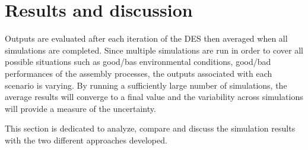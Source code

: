 \section{Results and discussion}
\label{results}
Outputs are evaluated after each iteration of the DES then averaged when all simulations are completed. Since multiple simulations are run in order to cover all possible situations such as good/bas environmental conditions, good/bad performances of the assembly processes, the outputs associated with each scenario is varying. By running a sufficiently large number of simulations, the average results will converge to a final value and the variability across simulations will provide a measure of the uncertainty.

This section is dedicated to analyze, compare and discuss the simulation results with the two different approaches developed.